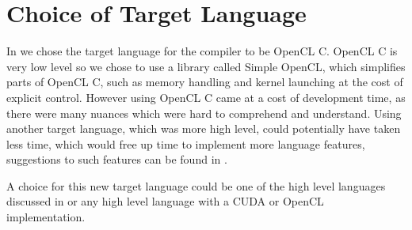 \section{Choice of Target Language}
In  we chose the target language for the compiler to be OpenCL C.
OpenCL C is very low level so we chose to use a library called Simple OpenCL, which simplifies parts of OpenCL C, such as memory handling and kernel launching at the cost of explicit control. 
However using OpenCL C came at a cost of development time, as there were many nuances which were hard to comprehend and understand. 
Using another target language, which was more high level, could potentially have taken less time,  which would free up time to implement more language features, suggestions to such features can be found in . 

A choice for this new target language could be one of the high level languages discussed in  or any high level language with a CUDA or OpenCL implementation. 
